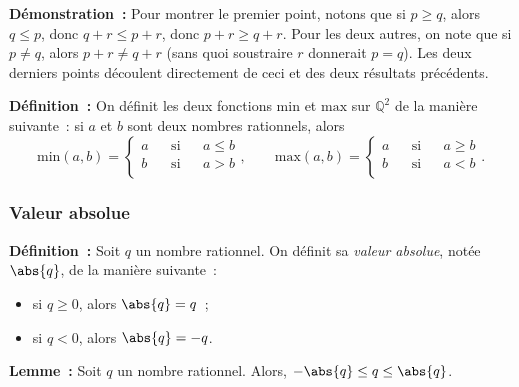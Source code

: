 \medskip

\noindent\textbf{Démonstration :} 
    Pour montrer le premier point, notons que si $p \geq q$, alors $q \leq p$, donc $q + r \leq p + r$, donc $p + r \geq q + r$.
    Pour les deux autres, on note que si $p \neq q$, alors $p + r \neq q + r$ (sans quoi soustraire $r$ donnerait $p = q$). 
    Les deux derniers points découlent directement de ceci et des deux résultats précédents.

    \done

\medskip

\noindent\textbf{Définition :} On définit les deux fonctions $\mathrm{min}$ et $\mathrm{max}$ sur $\mathbb{Q}^2$ de la manière suivante : si $a$ et $b$ sont deux nombres rationnels, alors 
\begin{equation*}
    \mathrm{min}(a,b) = \left\lbrace \begin{aligned}
        a & & \text{si} & & a \leq b \\
        b & & \text{si} & & a > b \\
    \end{aligned} \right. 
    , \qquad
    \mathrm{max}(a,b) = \left\lbrace \begin{aligned}
        a & & \text{si} & & a \geq b \\
        b & & \text{si} & & a < b \\
    \end{aligned} \right. 
    .
\end{equation*}

\subsubsection{Valeur absolue}

\noindent\textbf{Définition :}  \sindex[isy]{$\abs{\cdot}$}
    Soit $q$ un nombre rationnel. 
    On définit sa \emph{valeur absolue}, notée $\abs{q}$, de la manière suivante : 
    \begin{itemize}[nosep]
        \item si $q \geq 0$, alors $\abs{q} = q$ ; 
        \item si $q < 0$, alors $\abs{q} = -q$.
    \end{itemize}

\medskip

\noindent\textbf{Lemme :} Soit $q$ un nombre rationnel.
    Alors, $- \abs{q} \leq q \leq \abs{q}$.

\medskip


